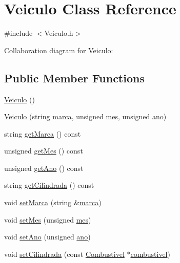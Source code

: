\hypertarget{class_veiculo}{\section{Veiculo Class Reference}
\label{class_veiculo}
}


{\ttfamily \#include $<$Veiculo.\+h$>$}



Collaboration diagram for Veiculo\+:
\subsection*{Public Member Functions}
\begin{DoxyCompactItemize}
\item 
\hyperlink{class_veiculo_aafab27708a2639bc83a4c3721e57d196}{Veiculo} ()
\item 
\hyperlink{class_veiculo_a27fc86a1eb8c2983aa64fe642d1880ac}{Veiculo} (string \hyperlink{class_veiculo_ab20b89442a0ddaedd074bb0de75838c8}{marca}, unsigned \hyperlink{class_veiculo_ac4146f7b3d38e31e3225074e0fb0dea9}{mes}, unsigned \hyperlink{class_veiculo_ae141824a9353b3f7ed99d5c34c830fe2}{ano})
\item 
string \hyperlink{class_veiculo_a2a9d144f41694ea56a33f20a1c97f80b}{get\+Marca} () const 
\item 
unsigned \hyperlink{class_veiculo_a9cd8a208e3a1dbf1ba02281f1e97f99c}{get\+Mes} () const 
\item 
unsigned \hyperlink{class_veiculo_af86f9122ce46d301c58e6247c641ff7b}{get\+Ano} () const 
\item 
string \hyperlink{class_veiculo_ab6a3585ac08c2fa92be12fa211b3ca8e}{get\+Cilindrada} () const 
\item 
void \hyperlink{class_veiculo_a4376b75295af584bea72db312e909d52}{set\+Marca} (string \&\hyperlink{class_veiculo_ab20b89442a0ddaedd074bb0de75838c8}{marca})
\item 
void \hyperlink{class_veiculo_abce426bdb78d81f59e4bd3de01b05fea}{set\+Mes} (unsigned \hyperlink{class_veiculo_ac4146f7b3d38e31e3225074e0fb0dea9}{mes})
\item 
void \hyperlink{class_veiculo_ad71370069a5a0f587fced2c49028cdfa}{set\+Ano} (unsigned \hyperlink{class_veiculo_ae141824a9353b3f7ed99d5c34c830fe2}{ano})
\item 
void \hyperlink{class_veiculo_a4093fd1f8b1c57873a4bc84dd434532d}{set\+Cilindrada} (const \hyperlink{class_combustivel}{Combustivel} $\ast$\hyperlink{class_veiculo_ad8416cc9da449baed5e07ed146572712}{combustivel})
\end{DoxyCompactItemize}
